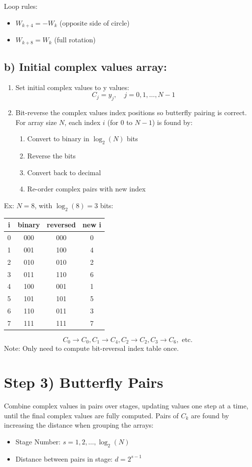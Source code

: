 \documentclass[12pt]{article}
\begin{document}
Loop rules:
\begin{itemize}
    \item $W_{k+4} = -W_k$ (opposite side of circle)
    \item $W_{k+8} = W_k$ (full rotation)
\end{itemize}

\subsection*{b) Initial complex values array:}
\begin{enumerate}[label=\roman*)]
    \item Set initial complex values to y values:
    \[C_j = y_j, \quad j=0,1,\ldots,N-1\]
    \item Bit-reverse the complex values index positions so butterfly pairing is correct.\\
    For array size $N$, each index $i$ (for 0 to $N-1$) is found by:
    \begin{enumerate}
        \item Convert to binary in $\log_2(N)$ bits
        \item Reverse the bits
        \item Convert back to decimal
        \item Re-order complex pairs with new index
    \end{enumerate}
\end{enumerate}

Ex: $N=8$, with $\log_2(8)=3$ bits:
\begin{center}
\begin{tabular}{|c|c|c|c|}
\hline
i & binary & reversed & new i\\
\hline
0 & 000 & 000 & 0\\
1 & 001 & 100 & 4\\
2 & 010 & 010 & 2\\
3 & 011 & 110 & 6\\
4 & 100 & 001 & 1\\
5 & 101 & 101 & 5\\
6 & 110 & 011 & 3\\
7 & 111 & 111 & 7\\
\hline
\end{tabular}
\end{center}

\[C_0 \to C_0, C_1 \to C_4, C_2 \to C_2, C_3 \to C_6, \text{ etc.}\]
Note: Only need to compute bit-reversal index table once.

\section*{Step 3) Butterfly Pairs}
Combine complex values in pairs over stages, updating values one step at a time, until the final complex values are fully computed. Pairs of $C_k$ are found by increasing the distance when grouping the arrays:
\begin{itemize}
    \item Stage Number: $s = 1,2,\ldots,\log_2(N)$
    \item Distance between pairs in stage: $d = 2^{s-1}$
\end{itemize}
\end{document}
